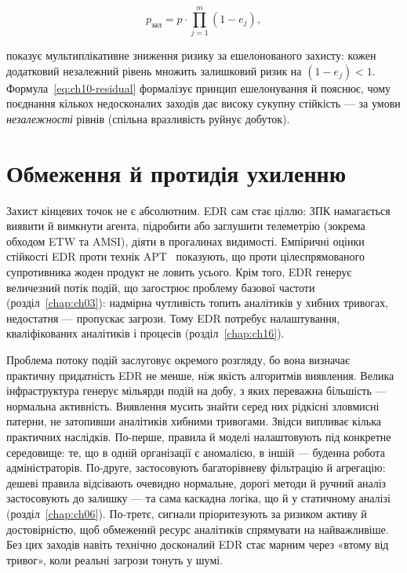 \begin{equation}
p_{\text{зал}} = p\cdot\prod_{j=1}^{m}(1-e_j),
\label{eq:ch10-residual}
\end{equation}

показує мультиплікативне зниження ризику за ешелонованого захисту: кожен додатковий незалежний рівень множить залишковий ризик на $(1-e_j)<1$. Формула~\eqref{eq:ch10-residual} формалізує принцип ешелонування й пояснює, чому поєднання кількох недосконалих заходів дає високу сукупну стійкість --- за умови \emph{незалежності} рівнів (спільна вразливість руйнує добуток).

\section{Обмеження й протидія ухиленню}\label{sec:ch10-limits}

Захист кінцевих точок не є абсолютним. EDR сам стає ціллю: ЗПК намагається виявити й вимкнути агента, підробити або заглушити телеметрію (зокрема обходом ETW та AMSI), діяти в прогалинах видимості. Емпіричні оцінки стійкості EDR проти технік APT~\cite{ch10:mitre-edr} показують, що проти цілеспрямованого супротивника жоден продукт не ловить усього. Крім того, EDR генерує величезний потік подій, що загострює проблему базової частоти (розділ~\ref{chap:ch03}): надмірна чутливість топить аналітиків у хибних тривогах, недостатня --- пропускає загрози. Тому EDR потребує налаштування, кваліфікованих аналітиків і процесів (розділ~\ref{chap:ch16}).

Проблема потоку подій заслуговує окремого розгляду, бо вона визначає практичну придатність EDR не менше, ніж якість алгоритмів виявлення. Велика інфраструктура генерує мільярди подій на добу, з яких переважна більшість --- нормальна активність. Виявлення мусить знайти серед них рідкісні зловмисні патерни, не затопивши аналітиків хибними тривогами. Звідси випливає кілька практичних наслідків. По-перше, правила й моделі налаштовують під конкретне середовище: те, що в одній організації є аномалією, в іншій --- буденна робота адміністраторів. По-друге, застосовують багаторівневу фільтрацію й агрегацію: дешеві правила відсівають очевидно нормальне, дорогі методи й ручний аналіз застосовують до залишку --- та сама каскадна логіка, що й у статичному аналізі (розділ~\ref{chap:ch06}). По-третє, сигнали пріоритезують за ризиком активу й достовірністю, щоб обмежений ресурс аналітиків спрямувати на найважливіше. Без цих заходів навіть технічно досконалий EDR стає марним через «втому від тривог», коли реальні загрози тонуть у шумі.

